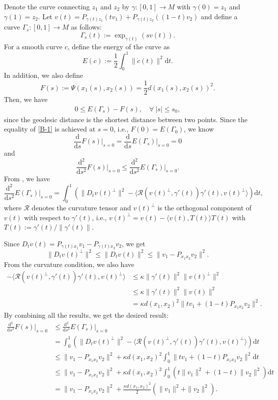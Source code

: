 \documentclass[11pt]{amsart}
\def\d{\mathrm{d}}
\newcommand{\dist}{d}%
\begin{document}
Denote the curve connecting $z_1$ and $z_2$ by $\gamma:[0,1]\to M$ with $\gamma(0)=z_1$ and $\gamma(1)=z_2$. Let $v(t)=P_{\gamma(t)z_1}(tv_1)+P_{\gamma(t)z_2}((1-t)v_2)$ and define a curve $\Gamma_s:[0,1]\to M$ as follows:
\[
\Gamma_s(t) :=\exp_{\gamma(t)}(sv(t)).
\]
For a smooth curve $c$, define the energy of the curve as  
\[
E(c) :=\frac{1}{2}\int_0^1\|\dot{c}(t)\|^2\d t.
\]
In addition, we also define 
\[
F(s):=\Psi(x_1(s), x_2(s))=\frac{1}{2}\dist(x_1(s),x_2(s))^2.
\]
Then, we have
\begin{align}\label{B-1}
0\leq E(\Gamma_s)-F(s),\quad\forall~|s|\leq s_0,
\end{align}
since the geodesic distance is the shortest distance between two points. Since the equality of \eqref{B-1} is achieved at $s=0$, i.e., $F(0)=E(\Gamma_0)$, we know
\[
\frac{\d}{\d s}F(s)\bigg|_{s=0}=\frac{\d}{\d s}E(\Gamma_s)\bigg|_{s=0}=0
\]
and
\[
\frac{\d^2}{\d s^2}F(s)\bigg|_{s=0}\leq\frac{\d^2}{\d s^2}E(\Gamma_s)\bigg|_{s=0}.
\]
From \cite[Theorem 10.22]{lee2018introduction}, we have
\[
\frac{\d^2}{\d s^2}E(\Gamma_s)\bigg|_{s=0}=\int_0^1\left(\|D_tv(t)^\perp\|^2-\langle \mathcal{R}(v(t)^\perp, \gamma'(t))\gamma'(t), v(t)^\perp\rangle\right)\d t,
\]
where $\mathcal{R}$ denotes the curvature tensor and $v(t)^\perp$ is the orthogonal component of $v(t)$ with respect to $\gamma'(t)$, i.e., $v(t)^\perp=v(t)-\langle v(t), T(t)\rangle T(t)$ with $T(t):=\gamma'(t)/\|\gamma'(t)\|$.



Since $D_tv(t)=P_{\gamma(t)x_1}v_1-P_{\gamma(t)x_2}v_2$, we get
\[
\|D_tv(t)^\perp\|^2\leq \|D_tv(t)\|^2\leq \|v_1-P_{x_1x_2}v_2\|^2.
\]
From the curvature condition, we also have
\begin{align*}
-\langle \mathcal{R}(v(t)^\perp, \gamma'(t))\gamma'(t), v(t)^\perp\rangle&\leq\kappa \|\gamma'(t)\|^2\|v(t)^\perp\|^2\\
&\leq \kappa\|\gamma'(t)\|^2\|v(t)\|^2\\
&=\kappa \dist(x_1, x_2)^2\|tv_1+(1-t)P_{x_1x_2}v_2\|^2.
\end{align*}
By combining all the results, we get the desired result:
\begin{align*}
\frac{\d^2}{\d s^2}F(s)\bigg|_{s=0}&\leq\frac{\d^2}{\d s^2}E(\Gamma_s)\bigg|_{s=0}\\
&=\int_0^1\left(\|D_tv(t)^\perp\|^2-\langle \mathcal{R}(v(t)^\perp, \gamma'(t))\gamma'(t), v(t)^\perp\rangle\right)\d t\\
&\leq \|v_1-P_{x_1x_2}v_2\|^2+\kappa \dist(x_1, x_2)^2\int_0^1\|tv_1+(1-t)P_{x_1x_2}v_2\|^2\d t\\
&\leq\|v_1-P_{x_1x_2}v_2\|^2+\kappa \dist(x_1, x_2)^2\int_0^1\left(t\|v_1\|^2+(1-t)\|v_2\|^2\right)\d t\\
&=\|v_1-P_{x_1x_2}v_2\|^2+\frac{\kappa \dist(x_1, x_2)^2}{2}\left(\|v_1\|^2+\|v_2\|^2\right).
\end{align*}
 
\end{document}
